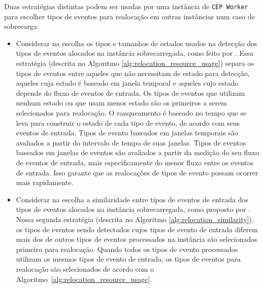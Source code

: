 Duas estratégias distintas podem ser usadas por uma instância de \texttt{CEP Worker} para escolher tipos de eventos para realocação em outras instâncias num caso de sobrecarga: 
\begin{itemize}
    \item Considerar na escolha os tipos e tamanhos de estados
     usados na detecção dos tipos de eventos alocados na instância sobrecarregada, como feito por \cite{6906776}. Essa estratégia (descrita no Algoritmo \ref{alg:relocation_resource_usage}) separa os tipos de eventos entre aqueles que não necessitam de estado para detecção, aqueles cuja estado é baseado em janela temporal e aqueles cujo estado depende do fluxo de eventos de entrada. Os tipos de eventos que utilizam nenhum estado ou que usam menos estado são os primeiros a serem selecionados para realocação. O ranqueamento é baseado no tempo que se leva para construir o estado de cada tipo de evento, de acordo com seus eventos de entrada. Tipos de evento baseados em janelas temporais são avaliados a partir do intervalo de tempo de suas janelas. Tipos de eventos baseados em janelas de eventos são avaliados a partir da medição do seu fluxo de eventos de entrada, mais especificamente do menor fluxo entre os eventos de entrada. Isso garante que as realocações de tipos de evento possam ocorrer mais rapidamente.%
    
     \item Considerar na escolha a similaridade entre tipos de eventos de entrada dos tipos de eventos alocados na instância sobrecarregada, como proposto por \cite{Isoyama:2012:SCE:2335484.2335498}. Nessa segunda estratégia (descrita no Algoritmo \ref{alg:relocation_similarity}), os tipos de eventos sendo detectados cujos tipos de evento de entrada diferem mais dos de outros tipos de eventos processados na instância são selecionados primeiro para realocação. Quando todos os tipos de evento processados utilizam os mesmos tipos de evento de entrada, os tipos de eventos para realocação são selecionados de acordo com o Algoritmo~\ref{alg:relocation_resource_usage}.

\end{itemize}


